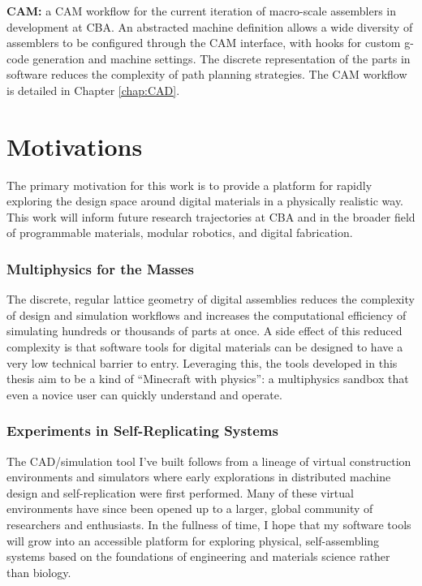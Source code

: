 {\textbf{CAM:} a CAM workflow for the current iteration of macro-scale assemblers in development at CBA.  An abstracted machine definition allows a wide diversity of assemblers to be configured through the CAM interface, with hooks for custom g-code generation and machine settings.  The discrete representation of the parts in software reduces the complexity of path planning strategies.  The CAM workflow is detailed in Chapter \ref{chap:CAD}.

\section{Motivations}
 
The primary motivation for this work is to provide a platform for rapidly exploring the design space around digital materials in a physically realistic way.  This work will inform future research trajectories at CBA and in the broader field of programmable materials, modular robotics, and digital fabrication.   

\subsubsection{Multiphysics for the Masses}

The discrete, regular lattice geometry of digital assemblies reduces the complexity of design and simulation workflows and increases the computational efficiency of simulating hundreds or thousands of parts at once.   A side effect of this reduced complexity is that software tools for digital materials can be designed to have a very low technical barrier to entry.  Leveraging this, the tools developed in this thesis aim to be a kind of ``Minecraft with physics'': a multiphysics sandbox that even a novice user can quickly understand and operate.

\subsubsection{Experiments in Self-Replicating Systems}

The CAD/simulation tool I've built follows from a lineage of virtual construction environments and simulators where early explorations in distributed machine design and self-replication were first performed.  Many of these virtual environments have since been opened up to a larger, global community of researchers and enthusiasts.  In the fullness of time, I hope that my software tools will grow into an accessible platform for exploring physical, self-assembling systems based on the foundations of engineering and materials science rather than biology.   


}
